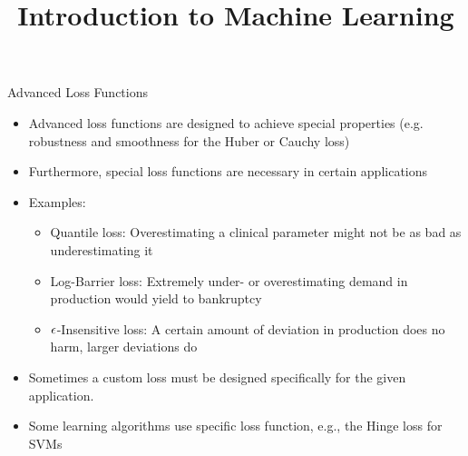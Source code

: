 




\newcommand{\titlefigure}{figure_man/optimization_steps.jpeg}
\newcommand{\learninggoals}{
  \item Know the Huber loss
  \item Know the Log-Barrier loss
  \item Know the $\eps$-Insensitive loss
  \item Know the Quantile loss
  \item Know the Cauchy loss
}

\title{Introduction to Machine Learning}
\date{}





\begin{vbframe}{Advanced Loss Functions}
\begin{itemize}
\item Advanced loss functions are designed to achieve special properties (e.g. robustness and smoothness for the Huber or Cauchy loss)
\item Furthermore, special loss functions are necessary in certain applications
\item Examples:
\begin{itemize}
\item Quantile loss: Overestimating a clinical parameter might not be as bad as underestimating it
\item Log-Barrier loss: Extremely under- or overestimating demand in production would yield to bankruptcy
\item $\epsilon$-Insensitive loss: A certain amount of deviation in production does no harm, larger deviations do
\end{itemize}
\item Sometimes a custom loss must be designed specifically for the given application.
\item Some learning algorithms use specific loss function, e.g., the Hinge loss for SVMs
\end{itemize}
\end{vbframe}


